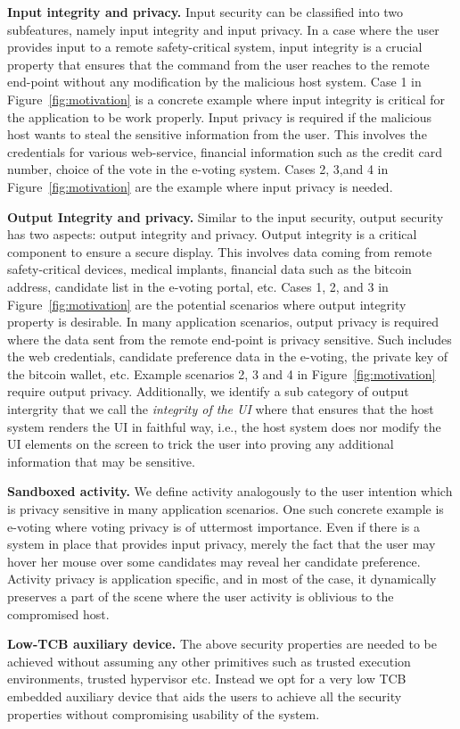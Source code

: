 \begin{mylist}
  \item \textbf{Input integrity and privacy.} Input security can be classified into two subfeatures, namely input integrity and input privacy. In a case where the user provides input to a remote safety-critical system, input integrity is a crucial property that ensures that the command from the user reaches to the remote end-point without any modification by the malicious host system. Case 1 in Figure~\ref{fig:motivation} is a concrete example where input integrity is critical for the application to be work properly. Input privacy is required if the malicious host wants to steal the sensitive information from the user. This involves the credentials for various web-service, financial information such as the credit card number, choice of the vote in the e-voting system. Cases 2, 3,and 4 in Figure~\ref{fig:motivation} are the example where input privacy is needed.
  \item \textbf{Output Integrity and privacy.} Similar to the input security, output security has two aspects: output integrity and privacy. Output integrity is a critical component to ensure a secure display. This involves data coming from remote safety-critical devices, medical implants, financial data such as the bitcoin address, candidate list in the e-voting portal, etc. Cases 1, 2, and 3 in Figure~\ref{fig:motivation} are the potential scenarios where output integrity property is desirable. In many application scenarios, output privacy is required where the data sent from the remote end-point is privacy sensitive. Such includes the web credentials, candidate preference data in the e-voting, the private key of the bitcoin wallet, etc. Example scenarios 2, 3 and 4 in Figure~\ref{fig:motivation} require output privacy. Additionally, we identify a sub category of output intergrity  that we call the \emph{integrity of the UI} where that ensures that the host system renders the UI in faithful way, i.e., the host system does nor modify the UI elements on the screen to trick the user into proving any additional information that may be sensitive.
  
  \item \textbf{Sandboxed activity.} We define activity analogously to the user intention which is privacy sensitive in many application scenarios. One such concrete example is e-voting where voting privacy is of uttermost importance. Even if there is a system in place that provides input privacy, merely the fact that the user may hover her mouse over some candidates may reveal her candidate preference. Activity privacy is application specific, and in most of the case, it dynamically preserves a part of the scene where the user activity is oblivious to the compromised host. 
  \item\textbf{Low-TCB auxiliary device.} The above security properties are needed to be achieved without assuming any other primitives such as trusted execution environments, trusted hypervisor etc. Instead we opt for a very low TCB embedded auxiliary device that aids the users to achieve all the security properties without compromising usability of the system. 
\end{mylist}

